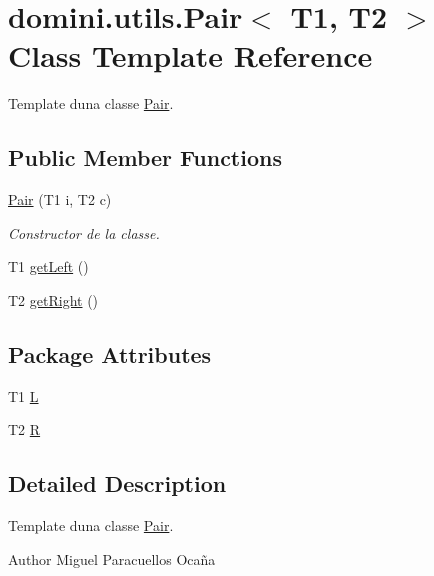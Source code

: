\hypertarget{classdomini_1_1utils_1_1Pair}{}\section{domini.\+utils.\+Pair$<$ T1, T2 $>$ Class Template Reference}
\label{classdomini_1_1utils_1_1Pair}


Template d\textquotesingle{}una classe \hyperlink{classdomini_1_1utils_1_1Pair}{Pair}.  


\subsection*{Public Member Functions}
\begin{DoxyCompactItemize}
\item 
\hyperlink{classdomini_1_1utils_1_1Pair_a9db8755d5034cf4f99f9007b9d6fd22d}{Pair} (T1 i, T2 c)
\begin{DoxyCompactList}\small\item\em Constructor de la classe. \end{DoxyCompactList}\item 
T1 \hyperlink{classdomini_1_1utils_1_1Pair_a9439fbd8488cb1fbf00c57f15f093c4b}{get\+Left} ()
\item 
T2 \hyperlink{classdomini_1_1utils_1_1Pair_a0dca94eb1a43952258bebe1dca4c84e9}{get\+Right} ()
\end{DoxyCompactItemize}
\subsection*{Package Attributes}
\begin{DoxyCompactItemize}
\item 
T1 \hyperlink{classdomini_1_1utils_1_1Pair_a276a0eee9fa97fc27b37fab887f07cea}{L}
\item 
T2 \hyperlink{classdomini_1_1utils_1_1Pair_aebf54d48000999b84e5e24a2c62088d4}{R}
\end{DoxyCompactItemize}


\subsection{Detailed Description}
Template d\textquotesingle{}una classe \hyperlink{classdomini_1_1utils_1_1Pair}{Pair}. 

\begin{DoxyAuthor}{Author}
Miguel Paracuellos Ocaña 
\end{DoxyAuthor}


